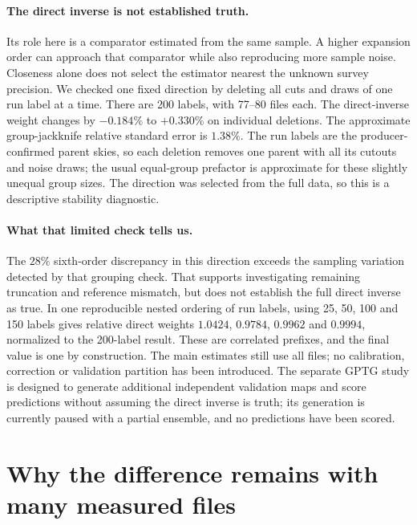 \documentclass[11pt]{article}
\begin{document}
\paragraph{The direct inverse is not established truth.}
Its role here is a comparator estimated from the same sample. A higher
expansion order can approach that comparator while also reproducing more
sample noise. Closeness alone does not select the estimator nearest the
unknown survey precision. We checked one fixed direction by deleting all
cuts and draws of one run label at a time. There are 200 labels, with
77--80 files each. The direct-inverse weight changes by $-0.184\%$ to
$+0.330\%$ on individual deletions. The approximate group-jackknife relative
standard error is $1.38\%$. The run labels are the producer-confirmed
parent skies, so each deletion removes one parent with all its cutouts and
noise draws; the usual equal-group prefactor is approximate for these
slightly unequal group sizes. The direction was
selected from the full data, so this is a descriptive stability diagnostic.

\paragraph{What that limited check tells us.}
The $28\%$ sixth-order discrepancy in this direction exceeds the sampling
variation detected by that grouping check. That supports investigating
remaining truncation and reference mismatch, but does not establish the
full direct inverse as true. In one reproducible nested ordering of run
labels, using 25, 50, 100 and 150 labels gives relative direct weights
$1.0424$, $0.9784$, $0.9962$ and $0.9994$, normalized to the 200-label
result. These are correlated prefixes, and the final value is one by
construction. The main estimates still use all files; no calibration,
correction or validation partition has been introduced. The separate
GPTG study is designed to generate additional independent validation maps
and score predictions without assuming the direct inverse is truth; its
generation is currently paused with a partial ensemble, and no predictions
have been scored.

\section{Why the difference remains with many measured files}
\end{document}
